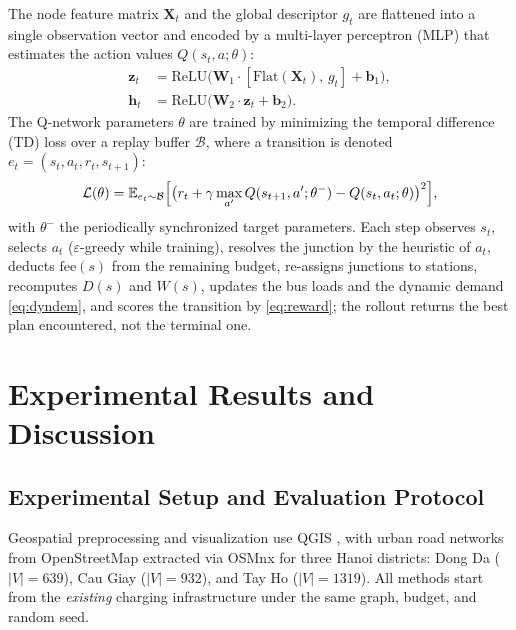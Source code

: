\documentclass[graybox]{svmult}
\begin{document}
The node feature matrix $\mathbf{X}_t$ and the global descriptor $g_t$ are flattened into a single observation vector and encoded by a multi-layer perceptron (MLP) that estimates the action values $Q(s_t,a;\theta)$:
\begin{equation}
\label{eq:mlp}
\begin{aligned}
\mathbf{z}_t &= \mathrm{ReLU}\bigl(\mathbf{W}_1\cdot[\mathrm{Flat}(\mathbf{X}_t),\,g_t]+\mathbf{b}_1\bigr),\\
\mathbf{h}_t &= \mathrm{ReLU}\bigl(\mathbf{W}_2\cdot\mathbf{z}_t+\mathbf{b}_2\bigr).
\end{aligned}
\end{equation}
The Q-network parameters $\theta$ are trained by minimizing the temporal difference (TD) loss over a replay buffer $\mathcal{B}$, where a transition is denoted $e_t=(s_t,a_t,r_t,s_{t+1})$:
\begin{equation}
\label{eq:tdloss}
\mathcal{L}(\theta)=\mathbb{E}_{e_t\sim\mathcal{B}}\Bigl[\bigl(r_t+\gamma\max_{a'}Q(s_{t+1},a';\theta^{-})-Q(s_t,a_t;\theta)\bigr)^{2}\Bigr],
\end{equation}
with $\theta^{-}$ the periodically synchronized target parameters. Each step observes $s_t$, selects $a_t$ ($\varepsilon$-greedy while training), resolves the junction by the heuristic of $a_t$, deducts $\mathrm{fee}(s)$ from the remaining budget, re-assigns junctions to stations, recomputes $D(s)$ and $W(s)$, updates the bus loads and the dynamic demand \eqref{eq:dyndem}, and scores the transition by \eqref{eq:reward}; the rollout returns the best plan encountered, not the terminal one.


\section{Experimental Results and Discussion}
\label{sec:results}

\subsection{Experimental Setup and Evaluation Protocol}
\label{subsec:setup}
Geospatial preprocessing and visualization use QGIS \cite{graser2025}, with urban road networks from OpenStreetMap \cite{OpenStreetMap} extracted via OSMnx \cite{boeing2017osmnx} for three Hanoi districts: Dong Da ($|V|=639$), Cau Giay ($|V|=932$), and Tay Ho ($|V|=1319$). All methods start from the \emph{existing} charging infrastructure under the same graph, budget, and random seed.
\end{document}
